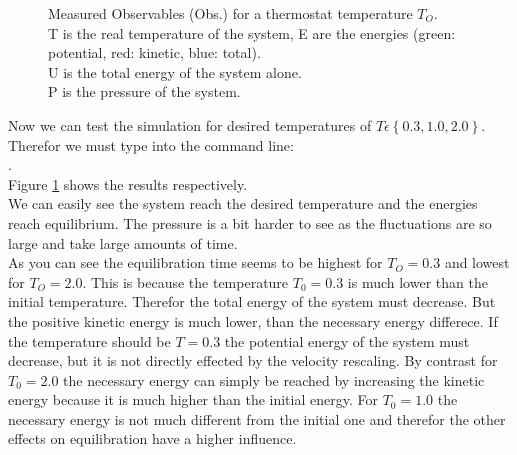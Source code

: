 \begin{figure}[ht]
\begin{subfigure}{0.3\textwidth}
\end{subfigure}

\caption{
Measured Observables (Obs.) for a thermostat temperature $T_O$.\\
T is the real temperature of the system, E are the energies (green: potential, red: kinetic, blue: total).\\
U is the total energy of the system alone.\\
P is the pressure of the system.}
\label{fig4}
\end{figure}

Now we can test the simulation for desired temperatures of  $T\epsilon\left\lbrace 0.3,1.0,2.0\right\rbrace $. 
Therefor we must type into the command line:\\

.\\


Figure \ref{fig4} shows the results respectively.\\

We can easily see the system reach the desired temperature and the energies reach equilibrium. The pressure is a bit harder to see as the fluctuations are so large and take large amounts of time.\\

As you can see the equilibration time seems to be highest for $T_O=0.3$ and lowest for $T_O=2.0$. 
This is because the temperature $T_0=0.3$ is much lower than the initial temperature. 
Therefor the total energy of the system must decrease. But the positive kinetic energy is much lower, than the necessary energy differece. 
If the temperature should be $T=0.3$ the potential energy of the system must decrease, but it is not directly effected by the velocity rescaling.
By contrast for $T_0=2.0$ the necessary energy can simply  be reached by increasing the kinetic energy because it is much higher than the initial energy.
For $T_0=1.0$ the necessary energy is not much different from the initial one and therefor the other effects on equilibration have a higher influence.